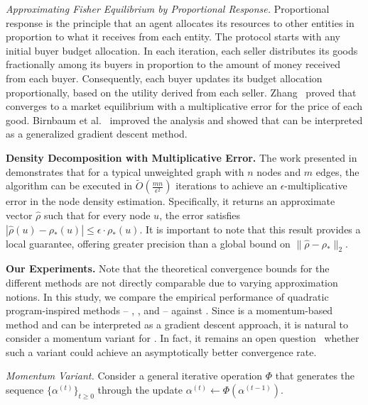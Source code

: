 \noindent \emph{Approximating Fisher Equilibrium by Proportional Response.} Proportional response is the principle that an agent allocates its resources to other entities in proportion to what it receives from each entity. The \pr protocol starts with any initial buyer budget allocation. In each iteration, each seller distributes its goods fractionally among its buyers in proportion to the amount of money received from each buyer. Consequently, each buyer updates its budget allocation proportionally, based on the utility derived from each seller. Zhang~\cite{DBLP:conf/icalp/Zhang09} proved that \pr converges to a market equilibrium with a multiplicative error for the price of each good. 
Birnbaum et al.~\cite{DBLP:conf/sigecom/BirnbaumDX11}
improved the analysis and showed that \pr can be interpreted as a generalized gradient descent method.


\noindent \textbf{Density Decomposition with Multiplicative Error.} The work presented in~\cite{DBLP:conf/sigecom/BirnbaumDX11}
demonstrates that for a typical unweighted graph with $n$ nodes and $m$ edges, the \pr algorithm can be executed in $\widetilde{O}\left(\frac{mn}{\epsilon^2}\right)$ iterations to achieve an $\epsilon$-multiplicative error in the node density estimation. Specifically, it returns an approximate vector $\widehat{\rho}$ such that for every node $u$, the error satisfies $|\widehat{\rho}(u) - \rho_*(u)| \leq \epsilon \cdot \rho_*(u)$.
It is important to note that this result provides a local guarantee, offering greater precision than a global bound on \mbox{$\|\widehat{\rho} - \rho_*\|_2$}.


\noindent \textbf{Our Experiments.} Note that the theoretical convergence bounds for the different methods are not directly comparable due to varying approximation notions. In this study, we compare the empirical performance of quadratic program-inspired methods -- \elist, \greedypp, and \fista \hspace{0pt}  -- against \pr. Since \fista is a momentum-based method and \pr can be interpreted as a gradient descent approach, it is natural to consider a momentum variant for \pr. In fact, it remains an open question~\cite{DBLP:conf/sigecom/BirnbaumDX11} whether such a variant could achieve an asymptotically better convergence rate.







\noindent \emph{Momentum Variant.}
Consider a general iterative operation $\Phi$ that generates the sequence $\{\alpha^{(t)}\}_{t \geq 0}$ through the update $\alpha^{(t)} \gets \Phi(\alpha^{(t-1)})$.

